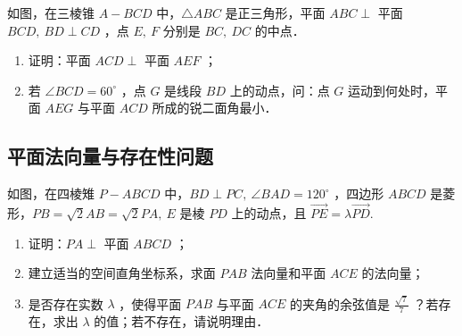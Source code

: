 \begin{problem}
如图，在三棱锥 $A-B C D$ 中，$\triangle A B C$ 是正三角形，平面 $A B C \perp$ 平面 $B C D, ~ B D \perp C D$ ，点 $E, ~ F$ 分别是 $B C, ~ D C$ 的中点．
\begin{enumerate}
    \item[(1)] 证明：平面 $A C D \perp$ 平面 $A E F$ ；
    \item[(2)] 若 $\angle B C D=60^{\circ}$ ，点 $G$ 是线段 $B D$ 上的动点，问：点 $G$ 运动到何处时，平面 $A E G$ 与平面 $A C D$ 所成的锐二面角最小．
\end{enumerate}

\begin{figure} [H]
    \resizebox{0.2\textwidth}{!}{}
\end{figure}

\end{problem}

\subsection{平面法向量与存在性问题}

\begin{problem}
如图，在四棱雉 $P-A B C D$ 中，$B D \perp P C, ~ \angle B A D=120^{\circ}$ ，四边形 $A B C D$ 是菱形，$P B=\sqrt{2} A B=\sqrt{2} P A, ~ E$ 是棱 $P D$ 上的动点，且 $\overrightarrow{P E}=\lambda \overrightarrow{P D}$.
\begin{enumerate}
    \item[(1)] 证明：$P A \perp$ 平面 $A B C D$ ；
    \item[(2)] 建立适当的空间直角坐标系，求面 $P A B$ 法向量和平面 $A C E$ 的法向量；
    \item[(3)] 是否存在实数 $\lambda$ ，使得平面 $P A B$ 与平面 $A C E$ 的夹角的余弦值是 $\frac{\sqrt{7}}{7}$ ？若存在，求出 $\lambda$ 的值；若不存在，请说明理由．
\end{enumerate}

\begin{figure} [H]
    \resizebox{0.2\textwidth}{!}{}
\end{figure}
\end{problem}